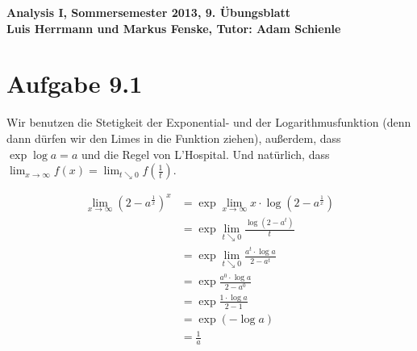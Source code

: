\documentclass[a4paper,german,12pt,smallheadings]{scrartcl}
\begin{document}
\begin{center}
\bfseries %
\sffamily %
\vspace{-40pt}
Analysis I, Sommersemester 2013, 9. Übungsblatt \\
Luis Herrmann und Markus Fenske, Tutor: Adam Schienle
\vspace{-10pt}
\end{center}

\section*{Aufgabe 9.1}

Wir benutzen die Stetigkeit der Exponential- und der Logarithmusfunktion (denn
dann dürfen wir den Limes in die Funktion ziehen), außerdem, dass $\exp \log a
= a$ und die Regel von L'Hospital. Und natürlich, dass $\lim_{x \to \infty}
f(x) = \lim_{t \searrow 0} f\left(\frac{1}{t}\right)$.

\begin{align*}
  \lim_{x \to \infty} \left(2-a^\frac{1}{x}\right)^x &= \exp \lim_{x \to \infty} x \cdot \log \left(2-a^\frac{1}{x}\right) \\
  &= \exp \lim_{t \searrow 0} \frac{\log (2-a^t)}{t} \\
  &= \exp \lim_{t \searrow 0} \frac{a^t \cdot \log a}{2-a^t} \\
  &= \exp \frac{a^0 \cdot \log a}{2-a^0} \\
  &= \exp \frac{1 \cdot \log a}{2-1} \\
  &= \exp (-\log a) \\
  &= \frac{1}{a}
\end{align*}
\end{document}
